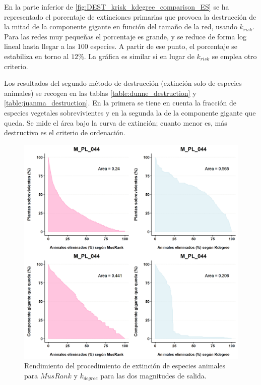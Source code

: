 En la parte inferior de \ref{fig:DEST_krisk_kdegree_comparison_ES} se ha representado el porcentaje de extinciones primarias que provoca la destrucción de la mitad de la componente gigante en función del tamaño de la red, usando ${k}_{risk}$. Para las redes muy pequeñas el porcentaje es grande, y se reduce de forma log lineal hasta llegar a las $100$ especies. A partir de ese punto, el porcentaje se estabiliza en torno al $12\%$. La gráfica es similar si en lugar de ${k}_{risk}$ se emplea otro criterio.

Los resultados del segundo método de destrucción (extinción solo de especies animales) se recogen en las tablas \ref{table:dunne_destruction} y \ref{table:juanma_destruction}. En la primera se tiene en cuenta la fracción de especies vegetales sobrevivientes y en la segunda la de la componente gigante que queda. Se mide el área bajo la curva de extinción; cuanto menor es, más destructivo es el criterio de ordenación.

\begin{figure}[h!]
\centering
\includegraphics[scale=0.55]{Figures/DEST_M_PL_044_juanmamethod_extinction_plot.png}
\caption {Rendimiento del procedimiento de extinción de especies animales para $MusRank$ y ${k}_{degree}$ para las dos magnitudes de salida.}
\label{fig:DEST_M_PL_044_juanmamethod_extinction_plot}
\end{figure}

